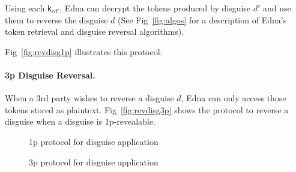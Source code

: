 Using each \texttt{k}$_{cd'}$, Edna can decrypt the tokens produced by disguise $d'$ and use them to
reverse the disguise $d$ (See Fig~\ref{fig:algos} for a description of Edna's token retrieval and
disguise reversal algorithms).

Fig~\ref{fig:revdisg1p} illustrates this protocol.

\paragraph{3p Disguise Reversal.}
When a 3rd party wishes to reverse a disguise $d$, Edna can only access those tokens stored as
plaintext. 
Fig~\ref{fig:revdisg3p} shows the protocol to reverse a disguise when a disguise is 1p-revealable.


\begin{figure*}
\caption{1p protocol for disguise application}
\label{fig:disgapp1p}
\end{figure*}

\begin{figure*}
\caption{3p protocol for disguise application}
\label{fig:disgapp3p}
\end{figure*}

